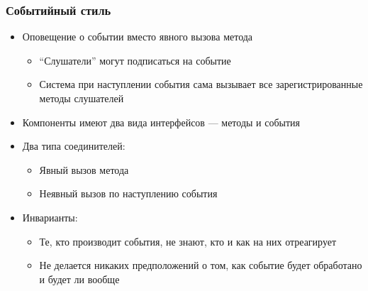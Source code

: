 \documentclass{../cscslides}
\begin{document}
    \begin{frame}
        \frametitle{Событийный стиль}
        \begin{itemize}
            \item Оповещение о событии вместо явного вызова метода
            \begin{itemize}
                \item ``Слушатели'' могут подписаться на событие
                \item Система при наступлении события сама вызывает все зарегистрированные методы слушателей
            \end{itemize}
            \item Компоненты имеют два вида интерфейсов --- методы и события
            \item Два типа соединителей:
            \begin{itemize}
                \item Явный вызов метода
                \item Неявный вызов по наступлению события
            \end{itemize}
            \item Инварианты:
            \begin{itemize}
                \item Те, кто производит события, не знают, кто и как на них отреагирует
                \item Не делается никаких предположений о том, как событие будет обработано и будет ли вообще
            \end{itemize}
        \end{itemize}
    \end{frame}
\end{document}
